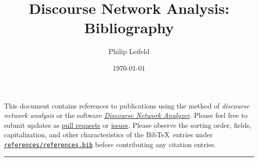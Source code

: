 \documentclass[a4paper, 11pt]{article}
\title{Discourse Network Analysis: Bibliography}
\author{Philip Leifeld}
\date{\today}
\begin{document}
\maketitle

This document contains references to publications using the method of \emph{discourse network analysis} or the software \href{https://github.com/leifeld/dna/}{\emph{Discourse Network Analyzer}}.
Please feel free to submit updates as \href{https://github.com/leifeld/dna/pulls}{pull requests} or \href{https://github.com/leifeld/dna/issues}{issues}.
Please observe the sorting order, fields, capitalization, and other characteristics of the Bib\TeX\ entries under \href{https://github.com/leifeld/dna/blob/master/bibliography/bibliography.bib}{\texttt{references/references.bib}} before contributing any citation entries.

\nocite{*}

\bigskip

\hrule



\end{document}
